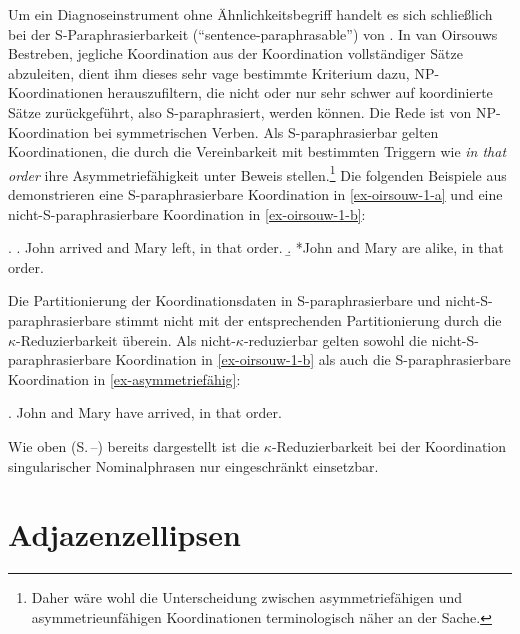 Um ein Diagnoseinstrument ohne Ähnlichkeitsbegriff handelt es sich schlie\ss lich bei der S-Para\-phra\-sier\-barkeit ("`sentence-paraphrasable"') von \citet[13f]{Oirsouw:87}. In van Oirsouws Bestreben, jegliche Koordination aus der Koordination vollständiger Sätze abzuleiten, dient ihm dieses sehr vage bestimmte Kriterium dazu, NP-Koordinationen herauszufiltern, die nicht oder nur sehr schwer auf koordinierte Sätze zurückgeführt, also S-paraphrasiert, werden können. Die Rede ist von NP-Koordination bei symmetrischen Verben. Als S-paraphrasierbar gelten Koordinationen, die durch die Vereinbarkeit mit bestimmten Triggern wie {\it in that order} ihre Asymmetriefähigkeit unter Beweis stellen.\footnote{Daher wäre wohl die Unterscheidung zwischen asymmetriefähigen und asymmetrieunfähigen Koordinationen terminologisch näher an der Sache.} Die folgenden Beispiele aus \citet[13f]{Oirsouw:87} demonstrieren eine S-paraphrasierbare Koordination in \ref{ex-oirsouw-1-a} und eine nicht-S-paraphrasierbare Koordination in \ref{ex-oirsouw-1-b}:   

\ex. \label{ex-oirsouw-1}
\a. John arrived and Mary left, in that order.\label{ex-oirsouw-1-a}
\b. *John and Mary are alike, in that order.\label{ex-oirsouw-1-b}

Die Partitionierung der Koordinationsdaten in S-paraphrasierbare und nicht-S-paraphrasier\-ba\-re stimmt nicht mit der entsprechenden Partitionierung durch die $\kappa$-Reduzierbarkeit überein. Als nicht-$\kappa$-reduzierbar gelten sowohl die nicht-S-paraphrasierbare Koordination in \ref{ex-oirsouw-1-b} als auch die S-paraphrasierbare Koordination in \ref{ex-asymmetriefähig}: 

\ex. \label{ex-asymmetriefähig} John and Mary have arrived, in that order.
 
Wie oben (S.\,\pageref{sec-plural}--\pageref{sec:asymmetrische:koordination}) bereits dargestellt ist die $\kappa$-Reduzierbarkeit bei der Koordination singularischer Nominalphrasen nur eingeschränkt einsetzbar.


\section{Adjazenzellipsen} \label{sec-adjazenzellipsen}

